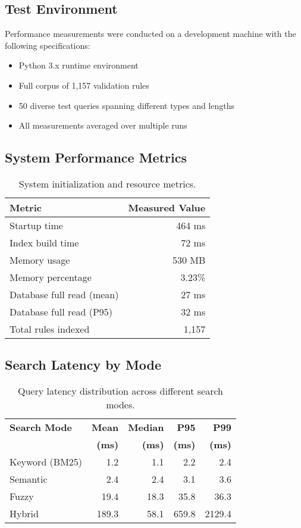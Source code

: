 \subsection{Test Environment}

Performance measurements were conducted on a development machine with the following specifications:
\begin{itemize}[leftmargin=*,itemsep=2pt,topsep=2pt]
 \item Python 3.x runtime environment
 \item Full corpus of 1,157 validation rules
 \item 50 diverse test queries spanning different types and lengths
 \item All measurements averaged over multiple runs
\end{itemize}

\subsection{System Performance Metrics}

\begin{table}[!htbp]
\centering
\begin{tabular}{lr}
\toprule
\textbf{Metric} & \textbf{Measured Value} \\
\midrule
Startup time & 464 ms \\
Index build time & 72 ms \\
Memory usage & 530 MB \\
Memory percentage & 3.23\% \\
Database full read (mean) & 27 ms \\
Database full read (P95) & 32 ms \\
Total rules indexed & 1,157 \\
\bottomrule
\end{tabular}
\caption{System initialization and resource metrics.}
\label{tab:system-metrics}
\end{table}

\subsection{Search Latency by Mode}

\begin{table}[!htbp]
\centering
\begin{tabular}{lrrrr}
\toprule
\textbf{Search Mode} & \textbf{Mean} & \textbf{Median} & \textbf{P95} & \textbf{P99} \\
& \textbf{(ms)} & \textbf{(ms)} & \textbf{(ms)} & \textbf{(ms)} \\
\midrule
Keyword (BM25) & 1.2 & 1.1 & 2.2 & 2.4 \\
Semantic & 2.4 & 2.4 & 3.1 & 3.6 \\
Fuzzy & 19.4 & 18.3 & 35.8 & 36.3 \\
Hybrid & 189.3 & 58.1 & 659.8 & 2129.4 \\
\bottomrule
\end{tabular}
\caption{Query latency distribution across different search modes.}
\label{tab:search-latency}
\end{table}

